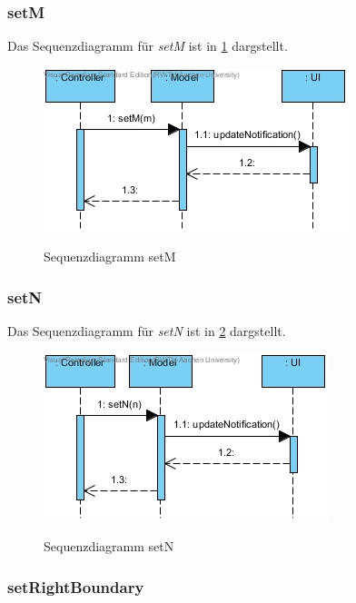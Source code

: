 \subsubsection*{setM}

Das Sequenzdiagramm für \emph{setM} ist in \ref{Sequenzdiagramm setM} dargstellt.

\begin{figure}[H]
	\centering
	\includegraphics[scale=.6]{Bilder/Model__setM().jpg}\\
	\caption{Sequenzdiagramm setM}
	\label{Sequenzdiagramm setM}
\end{figure}

\subsubsection*{setN}

Das Sequenzdiagramm für \emph{setN} ist in \ref{Sequenzdiagramm setN} dargstellt.

\begin{figure}[H]
	\centering
	\includegraphics[scale=.6]{Bilder/Model__setN().jpg}\\
	\caption{Sequenzdiagramm setN}
	\label{Sequenzdiagramm setN}
\end{figure}

\subsubsection*{setRightBoundary}

